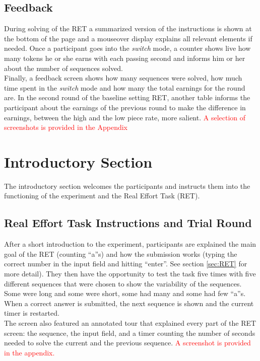     \subsection{Feedback}
    
    During solving of the RET a summarized version of the instructions is shown at the bottom of the page and a mouseover display explains all relevant elements if needed. Once a participant goes into the \textit{switch} mode, a counter shows live how many tokens he or she earns with each passing second and informs him or her about the number of sequences solved.\\
    
    Finally, a feedback screen shows how many sequences were solved, how much time spent in the \textit{switch} mode and how many the total earnings for the round are. In the second round of the baseline setting RET, another table informs the participant about the earnings of the previous round to make the difference in earnings, between the high and the low piece rate, more salient. \textcolor{red}{A selection of screenshots is provided in the Appendix}
    
    \section{Introductory Section}
    \label{sec:intro_exp}
    
    The introductory section welcomes the participants and instructs them into the functioning of the experiment and the Real Effort Task (RET).
    
    \subsection{Real Effort Task Instructions and Trial Round}
    
    After a short introduction to the experiment, participants are explained the main goal of the RET (counting ``a''s) and how the submission works (typing the correct number in the input field and hitting ``enter''. See section \ref{sec:RET} for more detail). They then have the opportunity to test the task five times with five different sequences that were chosen to show the variability of the sequences. Some were long and some were short, some had many and some had few ``a''s. When a correct answer is submitted, the next sequence is shown and the current timer is restarted. \\
    
    The screen also featured an annotated tour that explained every part of the RET screen: the sequence, the input field, and a timer counting the number of seconds needed to solve the current and the previous sequence. \textcolor{red}{A screenshot is provided in the appendix.}\\
    
